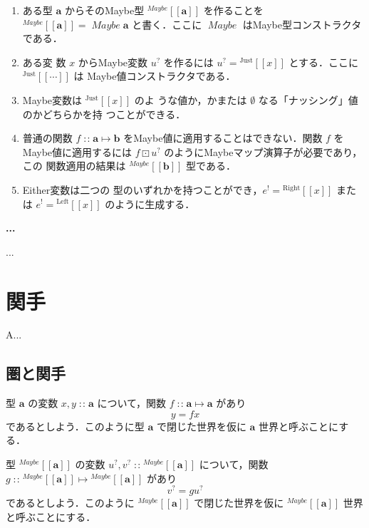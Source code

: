\documentclass[a5paper,twoside,fleqn]{jsbook}
\def\[{\left[\!\left[}
\def\]{\right]\!\right]}
\newenvironment{leader}{\begingroup\gt}{\endgroup}
\newenvironment{note}[1]{\begin{boxnote}\begin{center}\textbf{#1}\end{center}}{\end{boxnote}}
\newcommand{\mNothing}{\emptyset}
\DeclareMathOperator{\mIn}{{:\!:}}
\DeclareMathOperator{\mMapMaybe}{\boxdot}
\DeclareMathOperator{\mMapsTo}{\mapsto}
\newcommand{\mSpecialSub}[1]{\text{#1}}
\newcommand{\mLeft}{\mSpecialSub{Left}}
\newcommand{\mRight}{\mSpecialSub{Right}}
\newcommand{\mType}[1]{\mathbf{#1}}
\newcommand{\mGenericTypeAssemble}[2]{{}^{\mTypeConstructor{#1}}\[\mType{#2}\]}
\newcommand{\mMaybeType}[1]{\mGenericTypeAssemble{Maybe}{#1}}
\newcommand{\mTypeConstructor}[1]{\textit{#1}}
\DeclareMathOperator{\mMaybeTypeConstructor}{\mTypeConstructor{Maybe}}
\newcommand{\mGenericValueConstructor}[1]{\mathrm{#1}}
\newcommand{\mGenericWith}[2]{{}^\mGenericValueConstructor{#1}\[#2\]}
\newcommand{\mLeftWith}[1]{\mGenericWith{\mLeft}{#1}}
\newcommand{\mRightWith}[1]{\mGenericWith{\mRight}{#1}}
\newcommand{\mJustWith}[1]{\mGenericWith{Just}{#1}}
\newcommand{\mEither}[1]{{#1}^!}
\newcommand{\mMaybe}[1]{{#1}^?}
\newcommand{\mProj}[2]{#1\mMapsTo#2}
\begin{document}
\begin{enumerate}
\item ある型 $\mType{a}$ からそのMaybe型 $\mMaybeType{a}$ を作ることを
  $\mMaybeType{a}=\mMaybeTypeConstructor\mType{a}$ と書く．ここに
  $\mMaybeTypeConstructor$ はMaybe型コンストラクタである．\item ある変
  数 $x$ からMaybe変数 $\mMaybe{u}$ を作るには
  $\mMaybe{u}=\mJustWith{x}$ とする．ここに $\mJustWith{\dotsb}$ は
  Maybe値コンストラクタである．\item Maybe変数は $\mJustWith{x}$ のよ
  うな値か，かまたは $\mNothing$ なる「ナッシング」値のかどちらかを持
  つことができる．\item 普通の関数 $f\mIn\mProj{\mType{a}}{\mType{b}}$
  をMaybe値に適用することはできない．関数 $f$ をMaybe値に適用するには
  $f\mMapMaybe\mMaybe{u}$ のようにMaybeマップ演算子が必要であり，この
  関数適用の結果は $\mMaybeType{b}$ 型である．\item Either変数は二つの
  型のいずれかを持つことができ，$\mEither{e}=\mRightWith{x}$ または
  $\mEither{e}=\mLeftWith{x}$ のように生成する．
\end{enumerate}

\begin{note}{...}
...
\end{note}


\chapter{関手}
\label{ch:functor}

\begin{leader}
A...
\end{leader}

\section{圏と関手}

型 $\mType{a}$ の変数 $x,y\mIn\mType{a}$ について，関数
$f\mIn\mProj{\mType{a}}{\mType{a}}$ があり
\begin{equation}
y=fx
\end{equation}
であるとしよう．このように型 $\mType{a}$ で閉じた世界を仮に
$\mType{a}$ 世界と呼ぶことにする．

型 $\mMaybeType{a}$ の変数 $\mMaybe{u},\mMaybe{v}\mIn\mMaybeType{a}$
について，関数 $g\mIn\mProj{\mMaybeType{a}}{\mMaybeType{a}}$ があり
\begin{equation}
\mMaybe{v}=g\mMaybe{u}
\end{equation}
であるとしよう．このように $\mMaybeType{a}$ で閉じた世界を仮に
$\mMaybeType{a}$ 世界と呼ぶことにする．
\end{document}
